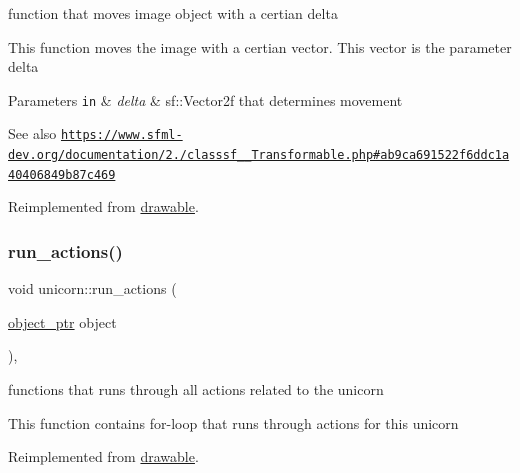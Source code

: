 function that moves image object with a certian delta 

This function moves the image with a certian vector. This vector is the parameter delta


\begin{DoxyParams}[1]{Parameters}
\mbox{\tt in}  & {\em delta} & sf\+::\+Vector2f that determines movement\\
\hline
\end{DoxyParams}
\begin{DoxySeeAlso}{See also}
\href{https://www.sfml-dev.org/documentation/2.0/classsf_1_1Transformable.php#ab9ca691522f6ddc1a40406849b87c469}{\tt https\+://www.\+sfml-\/dev.\+org/documentation/2./classsf\+\_\+\_\+Transformable.\+php\#ab9ca691522f6ddc1a40406849b87c469} 
\end{DoxySeeAlso}


Reimplemented from \hyperlink{classdrawable_ad0d3930c045cc6776aa2c3965be32491}{drawable}.

\mbox{\label{classunicorn_aadb47a9981c46d6add8704074df117df}} 
\subsubsection{\texorpdfstring{run\+\_\+actions()}{run\_actions()}}
{\footnotesize\ttfamily void unicorn\+::run\+\_\+actions (\begin{DoxyParamCaption}\item[{\hyperlink{drawable_8hpp_aab5add95f06d2ba25dbfed8eb07274fa}{object\+\_\+ptr}}]{object }\end{DoxyParamCaption})\hspace{0.3cm}{\ttfamily [override]}, {\ttfamily [virtual]}}



functions that runs through all actions related to the unicorn 

This function contains for-\/loop that runs through actions for this unicorn 

Reimplemented from \hyperlink{classdrawable_a715df01a318331e5611a2b0ad30109ff}{drawable}.

\mbox{\label{classunicorn_af0e2581c426b4b1e32f8a7b484b4e242}} 
